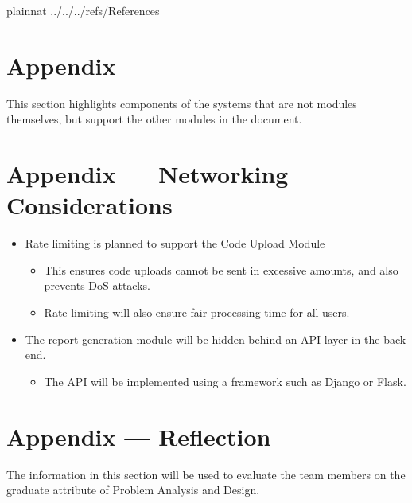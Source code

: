 \documentclass[12pt, titlepage]{article}
\begin{document}
\newpage

 {plainnat}
 {../../../refs/References}

\newpage

\section{Appendix} \label{Appendix}
This section highlights components of the systems that are not modules themselves, but support the other modules in the document.

\section*{Appendix --- Networking Considerations}
\begin{itemize}
    \item Rate limiting is planned to support the Code Upload Module
    \begin{itemize}
        \item This ensures code uploads cannot be sent in excessive amounts, and also prevents DoS attacks.
        \item Rate limiting will also ensure fair processing time for all users.
    \end{itemize}
    \item The report generation module will be hidden behind an API layer in the back end.
    \begin{itemize}
        \item The API will be implemented using a framework such as Django or Flask.
    \end{itemize}
\end{itemize}

\section*{Appendix --- Reflection}

The information in this section will be used to evaluate the team members on the
graduate attribute of Problem Analysis and Design.


\end{document}
